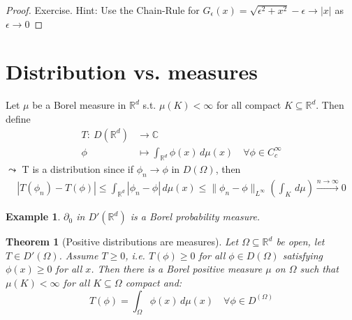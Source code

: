 \documentclass{report}
\theoremstyle{tommy}
\newtheorem{thm}[defn]{Theorem}
\newtheorem{eg}[defn]{Example}
\begin{document}
  \begin{proof}
    Exercise. Hint: Use the Chain-Rule for \(G_\epsilon(x) = \sqrt{\epsilon^2 + x^2} - \epsilon \to |x|\) as  \(\epsilon \to 0\)
  \end{proof}

  \section{Distribution vs. measures}
  Let \(\mu\) be a Borel measure in \(\mathbb{R}^d\) s.t. \(\mu(K) < \infty\) for all compact \(K \subseteq \mathbb{R}^d\). Then define 
  \begin{align*}
    T: \ D(\mathbb{R}^d) &\longrightarrow \mathbb{C} \\
    \phi &\longmapsto \int_{\mathbb{R}^d} \phi(x) \, d\mu(x) \quad \forall \phi \in C_c^\infty
  \end{align*}
  \(\leadsto\) T is a distribution since if \(\phi_n \to \phi\) in \(D(\Omega)\), then
  \begin{align*}
    |T(\phi_n) - T(\phi)| 
    \le \int_{\mathbb{R}^d} |\phi_n - \phi| \, d\mu(x) \le \|\phi_n - \phi\|_{L^\infty} \left(\int_{K} \, d \mu \right) \xrightarrow{n \to \infty} 0
  \end{align*}
  
  \begin{eg}
    \(\partial_0\) in \(D'(\mathbb{R}^d)\) is a Borel probability measure.
  \end{eg}  
  
  \begin{thm}[Positive distributions are measures] 
    Let \(\Omega \subseteq \mathbb{R}^d\) be open, let \(T \in D'(\Omega)\). Assume \(T \ge 0\), i.e. \(T(\phi) \ge 0\) for all \(\phi \in D(\Omega)\) satisfying \(\phi(x) \ge 0\) for all \(x\). Then there is a Borel positive measure \(\mu\) on \(\Omega\) such that \(\mu(K) < \infty\) for all \(K \subseteq \Omega\) compact and:
    \[T(\phi) = \int_\Omega \phi(x) \, d\mu (x) \quad \forall \phi \in D^(\Omega)\]
  \end{thm}
\end{document}
